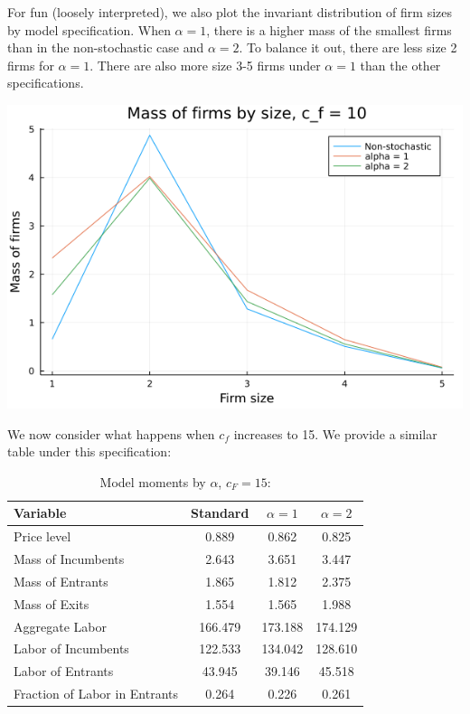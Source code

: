 \documentclass[12pt]{article}
\begin{document}
For fun (loosely interpreted), we also plot the invariant distribution of firm sizes by model specification. When $\alpha =1$, there is a higher mass of the smallest firms than in the non-stochastic case and $\alpha = 2$. To balance it out, there are less size 2 firms for $\alpha = 1$. There are also more size 3-5 firms under $\alpha = 1$ than the other specifications. 
\begin{center}
    \includegraphics[scale=0.7]{muplot10.png}
\end{center}
We now consider what happens when $c_f$ increases to 15. We provide a similar table under this specification:
\begin{table}[htbp]
    \centering
    \caption{Model moments by $\alpha$, $c_F = 15$:}
      \begin{tabular}{lccc}
          \toprule
            Variable                & Standard             & $\alpha = 1$           & $\alpha = 2$           \\
          \midrule
            Price level                    & 0.889      & 0.862        &     0.825      \\
            Mass of Incumbents               & 2.643      & 3.651          & 3.447                \\
            Mass of Entrants      & 1.865        & 1.812       & 2.375      \\
            Mass of Exits      & 1.554         & 1.565           & 1.988                \\
            Aggregate Labor  & 166.479       & 173.188          & 174.129                  \\
            Labor of Incumbents   & 122.533         & 134.042         & 128.610                \\
            Labor of Entrants  & 43.945        & 39.146         & 45.518                  \\
            Fraction of Labor in Entrants   & 0.264         & 0.226         & 0.261                  \\
          \bottomrule
      \end{tabular}
    \label{tab:cf15}
  \end{table}
\end{document}
